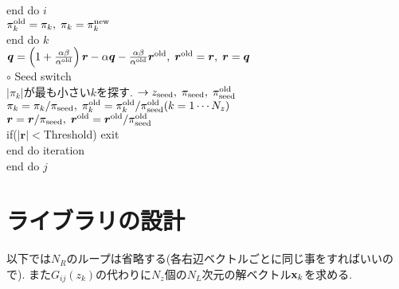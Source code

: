 \documentclass[12pt,titlepage]{jarticle}
\begin{document}
end do $i$
\\\hspace{1.5cm}
$\pi_k^{\rm old} = \pi_k,\; \pi_k = \pi_k^{\rm new}$
\\\hspace{1.0cm}
end do $k$
\\\hspace{1.0cm}
${\boldsymbol q} = \left( 1 + \frac{\alpha \beta}{\alpha^{\rm old}} \right) {\boldsymbol r}
- \alpha {\boldsymbol q} - \frac{\alpha \beta}{\alpha^{\rm old}} {\boldsymbol r}^{\rm old},\; 
{\boldsymbol r}^{\rm old} = {\boldsymbol r},\; {\boldsymbol r} = {\boldsymbol q}$
\\\hspace{1.0cm}
$\circ$ Seed switch
\\\hspace{1.0cm}
$|\pi_k|$が最も小さい$k$を探す. $\rightarrow z_{\rm seed},\; \pi_{\rm seed},\; \pi_{\rm seed}^{\rm old} $
\\\hspace{1.0cm}
$\pi_k = \pi_k /\pi_{\rm seed},\; \pi_k^{\rm old} = \pi_k^{\rm old} / \pi_{\rm seed}^{\rm old} (k=1 \cdots N_z)$
\\\hspace{1.0cm}
${\boldsymbol r} = {\boldsymbol r} / \pi_{\rm seed},\; {\boldsymbol r}^{\rm old} = {\boldsymbol r}^{\rm old} / \pi_{\rm seed}^{\rm old}$
\\\hspace{1.0cm}
if($|{\boldsymbol r}| < $Threshold) exit
\\\hspace{0.5cm}
end do iteration
\\
end do $j$

\section{ライブラリの設計}

以下では$N_R$のループは省略する(各右辺ベクトルごとに同じ事をすればいいので).
また$G_{i j}(z_k)$の代わりに$N_z$個の$N_L$次元の解ベクトル${\bf x}_{k}$を求める.
\end{document}

